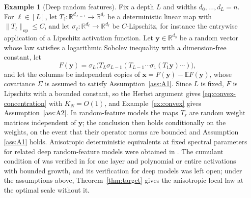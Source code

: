 \documentclass[11pt,reqno]{amsart}
\def\R{\mathbb{R}}
\def\x{\mathbf{x}}
\def\E{\mathbb{E}}
\def\op{\mathrm{op}}
\def\by{\boldsymbol{y}}
\theoremstyle{definition}
\newtheorem{example}[theorem]{Example}
\numberwithin{equation}{section}
\numberwithin{figure}{section}
\begin{document}
\begin{example}[Deep random features]\label{ex:deepRF}
    Fix a depth $L$ and widths $d_0,\ldots,d_L=n$. For $\ell\in[L]$, let $T_\ell:\R^{d_{\ell-1}}\to\R^{d_\ell}$ be a deterministic linear map with $\|T_\ell\|_\op\le C$, and let $\sigma_\ell:\R^{d_\ell}\to\R^{d_\ell}$ be $C$-Lipschitz, for instance the entrywise application of a Lipschitz activation function. Let $\by\in\R^{d_0}$ be a random vector whose law satisfies a logarithmic Sobolev inequality with a dimension-free constant, let
\[
 F(\by)=\sigma_L\big(T_L\sigma_{L-1}(T_{L-1}\cdots\sigma_1(T_1\by)\cdots)\big),
\]
and let the columns be independent copies of $\x=F(\by)-\E F(\by)$, whose covariance $\Sigma$ is assumed to satisfy Assumption~\ref{ass:A1}. Since $L$ is fixed, $F$ is Lipschitz with a bounded constant, so the Herbst argument gives \eqref{eq:convex-concentration} with $K_N=O(1)$, and Example~\ref{ex:convex} gives Assumption~\ref{ass:A2}. In random-feature models the maps $T_\ell$ are random weight matrices independent of $\by$; the conclusion then holds conditionally on the weights, on the event that their operator norms are bounded and Assumption \ref{ass:A1} holds. Anisotropic deterministic equivalents at fixed spectral parameters for related deep random-feature models were obtained in \cite{schroder2023deterministic}. The cumulant condition of \cite{fan2026anisotropic} was verified in \cite[Proposition~2.17]{fan2026anisotropic} for one layer and polynomial or entire activations with bounded growth, and its verification for deep models was left open; under the assumptions above, Theorem~\ref{thm:target} gives the anisotropic local law at the optimal scale without it.
\end{example}
\end{document}
